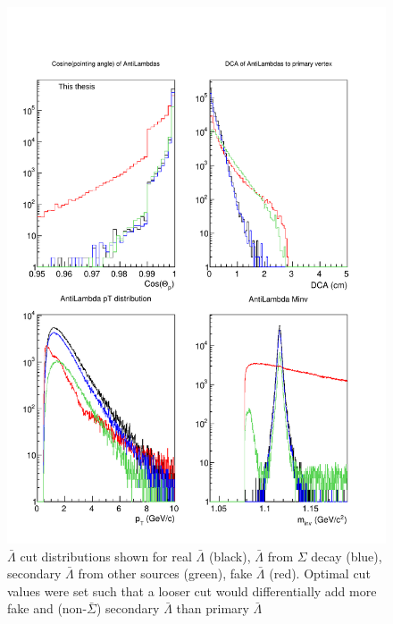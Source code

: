 \begin{figure}
\includegraphics[width=36pc]{Figures/2014-03-31-Distribution-AntiLambda-4Types-CosP-DCA-pT-Minv.pdf}
\caption[$\bar{\Lambda}$ cut distributions]{$\bar{\Lambda}$ cut distributions shown for real $\bar{\Lambda}$ (black), $\bar{\Lambda}$ from $\Sigma$ decay (blue), secondary $\bar{\Lambda}$ from other sources (green), fake $\bar{\Lambda}$ (red). 
Optimal cut values were set such that a looser cut would differentially add more fake and (non-$\bar{\Sigma}$) secondary $\bar{\Lambda}$ than primary $\bar{\Lambda}$}
\label{fig:AntiLambdaCutDists1}
\end{figure}

